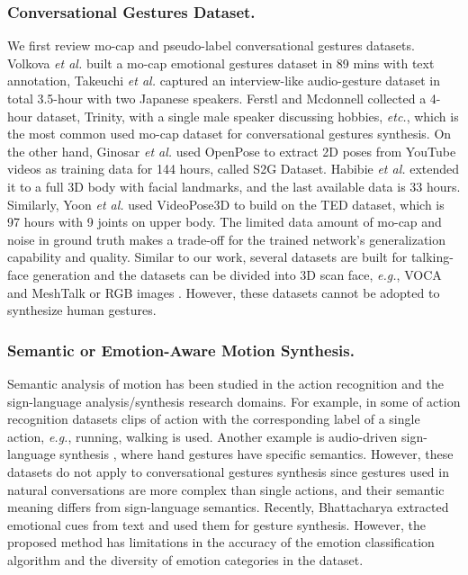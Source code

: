 \documentclass[runningheads]{llncs}
\begin{document}
\subsubsection{Conversational Gestures Dataset.} We first review mo-cap and pseudo-label conversational gestures datasets. Volkova \textit{et al.} \cite{volkova2014mpi} built a mo-cap emotional gestures dataset in 89 mins with text annotation, Takeuchi \textit{et al.} \cite{takeuchi2017speech} captured an interview-like audio-gesture dataset in total 3.5-hour with two Japanese speakers. Ferstl and Mcdonnell \cite{ferstl2018investigating} collected a 4-hour dataset, Trinity, with a single male speaker discussing hobbies, \textit{etc.}, which is the most common used mo-cap dataset for conversational gestures synthesis. On the other hand, Ginosar \textit{et al.} \cite{ginosar2019learning} used OpenPose \cite{cao2019openpose} to extract 2D poses from YouTube videos as training data for 144 hours, called S2G Dataset. Habibie \textit{et al.} \cite{habibie2021learning} extended it to a full 3D body with facial landmarks, and the last available data is 33 hours. Similarly, Yoon \textit{et al.} \cite{yoon2020speech} used VideoPose3D \cite{pavllo20193d} to build on the TED dataset, which is 97 hours with 9 joints on upper body. The limited data amount of mo-cap and noise in ground truth makes a trade-off for the trained network's generalization capability and quality. Similar to our work, several datasets are built for talking-face generation and the datasets can be divided into 3D scan face, \textit{e.g.}, VOCA \cite{takeuchi2017creating} and MeshTalk \cite{richard2021meshtalk} or RGB images \cite{alghamdi2018corpus,cao2014crema,cooke2006audio,jackson2014surrey,wang2020mead}. However, these datasets cannot be adopted to synthesize human gestures.

\vspace{-0.5cm}

\subsubsection{Semantic or Emotion-Aware Motion Synthesis.}
Semantic analysis of motion has been studied in the action recognition and the sign-language analysis/synthesis research domains. For example, in some of action recognition datasets \cite{ionescu2013human3,kay2017kinetics,carreira2017quo,chen2015utd,singh2010muhavi,bloom2012g3d,liu2016benchmarking,song2017end,perera2020multiviewpoint,wang2012robust} clips of action with the corresponding label of a single action, \textit{e.g.}, running, walking \cite{punnakkal2021babel} is used. Another example is audio-driven sign-language synthesis \cite{kapoor2021towards}, where hand gestures have specific semantics. However, these datasets do not apply to conversational gestures synthesis since gestures used in natural conversations are more complex than single actions, and their semantic meaning differs from sign-language semantics. Recently, Bhattacharya \cite{bhattacharya2021speech2affectivegestures}  extracted emotional cues from text and used them for gesture synthesis. However, the proposed method has limitations in the accuracy of the emotion classification algorithm and the diversity of emotion categories in the dataset.
\end{document}
